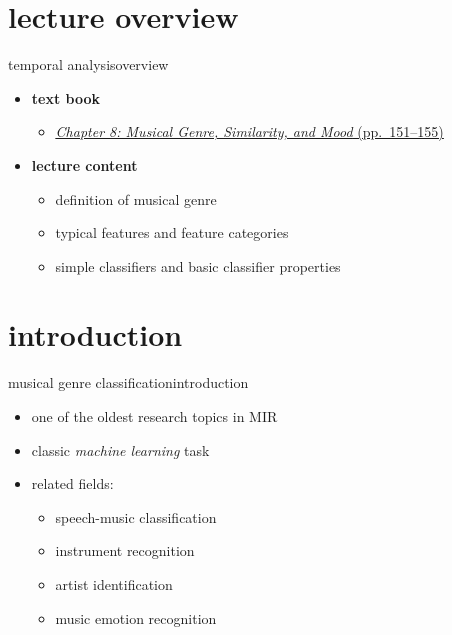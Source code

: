 

\subtitle{Part 9.1: Genre Classification}


	

    \section[overview]{lecture overview}
        \begin{frame}{temporal analysis}{overview}
            \begin{itemize}
                \item   \textbf{text book}  
                    \begin{itemize}
                        \item   \href{http://ieeexplore.ieee.org/xpl/articleDetails.jsp?tp=&arnumber=6331125&}{\underline{\textit{Chapter 8: Musical Genre, Similarity, and Mood} (pp.~151--155)}}
                    \end{itemize}
                \bigskip
                \item<2->   \textbf{lecture content}
                    \begin{itemize}
                        \item<2->   definition of musical genre
                        \item<3->   typical features and feature categories
                        \item<4->   simple classifiers and basic classifier properties
                    \end{itemize}
            \end{itemize}
        \end{frame}

    \section[intro]{introduction}
        \begin{frame}{musical genre classification}{introduction}
            \begin{itemize}
                \item	one of the oldest research topics in MIR
                \item<2->	classic \textit{machine learning }task
                \item<3->	related fields:
                    \begin{itemize}
                        \item	speech-music classification
                        \item	instrument recognition
                        \item   artist identification
                        \item   music emotion recognition
                    \end{itemize}
            \end{itemize}
        \end{frame}


